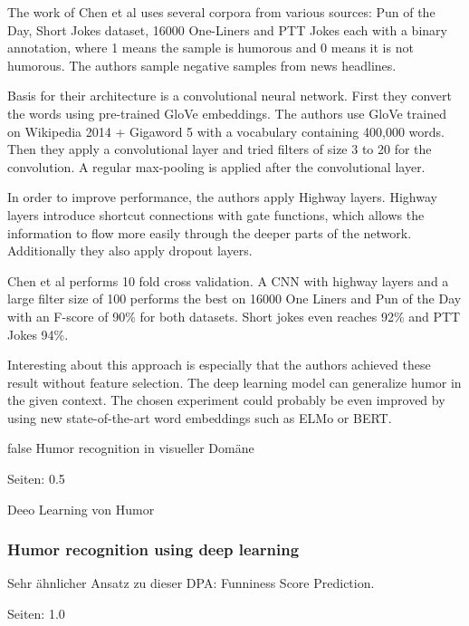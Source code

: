 \documentclass[draft,final,oneside]{vutinfth} %
\begin{document}
The work of Chen et al uses several corpora from various sources: Pun of the Day, Short Jokes dataset, 16000 One-Liners and PTT Jokes each with a binary annotation, where 1 means the sample is humorous and 0 means it is not humorous. The authors sample negative samples from news headlines.

Basis for their architecture is a convolutional neural network. First they convert the words using pre-trained GloVe embeddings. The authors use GloVe trained on Wikipedia 2014 + Gigaword 5 with a vocabulary containing 400,000 words. Then they apply a convolutional layer and tried filters of size 3 to 20 for the convolution. A regular max-pooling is applied after the convolutional layer.

In order to improve performance, the authors apply Highway layers. Highway layers introduce shortcut connections with gate functions, which allows the information to flow more easily through the deeper parts of the network. Additionally they also apply dropout layers.

Chen et al performs 10 fold cross validation. A CNN with highway layers and a large filter size of 100 performs the best on 16000 One Liners and Pun of the Day with an F-score of 90\% for both datasets. Short jokes even reaches 92\% and PTT Jokes 94\%. 

Interesting about this approach is especially that the authors achieved these result without feature selection. The deep learning model can generalize humor in the given context. The chosen experiment could probably be even improved by using new state-of-the-art word embeddings such as ELMo or BERT. \cite{elmo} \cite{bert}

\if false
Humor recognition in visueller Domäne

\cite{chen2017convolutional}

Seiten: 0.5


Deeo Learning von Humor 

\cite{chen2018humor}



\subsubsection{Humor recognition using deep learning}

Sehr ähnlicher Ansatz zu dieser DPA: Funniness Score Prediction.

\cite{chiruzzo2019overview}

Seiten: 1.0
\fi
\end{document}
